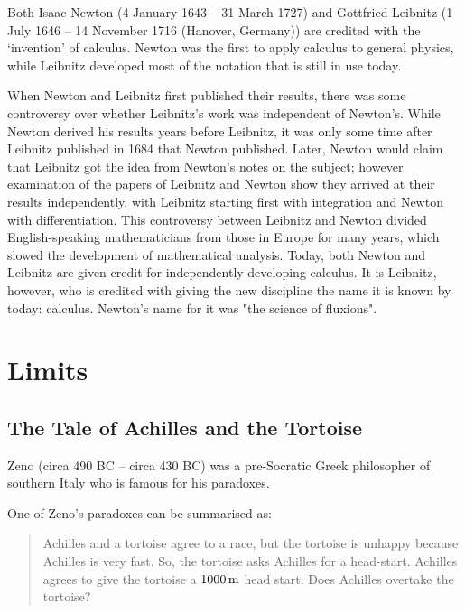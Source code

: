 \begin{IFact}
{Both Isaac Newton (4 January 1643 -- 31 March 1727) and Gottfried Leibnitz (1 July 1646 -- 14 November 1716 (Hanover, Germany)) are credited with the `invention' of calculus. Newton was the first to apply calculus to general physics, while Leibnitz developed most of the notation that is still in use today.

When Newton and Leibnitz first published their results, there was some controversy over whether Leibnitz's work was independent of Newton's. While Newton derived his results years before Leibnitz, it was only some time after Leibnitz published in 1684 that Newton published. Later, Newton would claim that Leibnitz got the idea from Newton's notes on the subject; however examination of the papers of Leibnitz and Newton show they arrived at their results independently, with Leibnitz starting first with integration and Newton with differentiation. This controversy between Leibnitz and Newton divided English-speaking mathematicians from those in Europe for many years, which slowed the development of mathematical analysis. Today, both Newton and Leibnitz are given credit for independently developing calculus. It is Leibnitz, however, who is credited with giving the new discipline the name it is known by today: calculus. Newton's name for it was "the science of fluxions".}
\end{IFact}

\section{Limits}
\label{md:limits}

\subsection{The Tale of Achilles and the Tortoise}

\begin{IFact}
{Zeno (circa 490 BC -- circa 430 BC) was a pre-Socratic Greek philosopher of southern Italy who is famous for his paradoxes.}
\end{IFact}
One of Zeno's paradoxes can be summarised as:
\begin{quote}
Achilles and a tortoise agree to a race, but the tortoise is unhappy because Achilles is very fast. So, the tortoise asks Achilles for a head-start. Achilles agrees to give the tortoise a $1 000\,\rm{m}$ head start. Does Achilles overtake the tortoise?
\end{quote}


